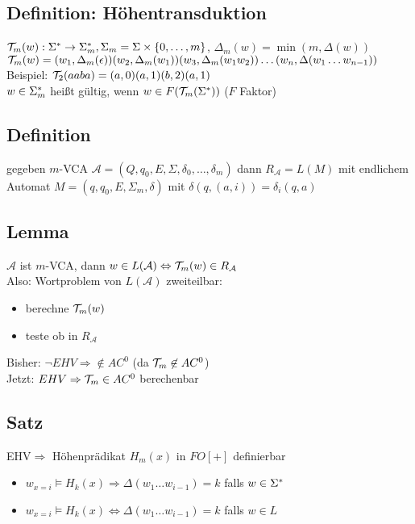    \subsection{Definition: Höhentransduktion}
        $\mathcal{T}_m(w):\Sigma^*\rightarrow\Sigma^*_m, \Sigma_m=\Sigma\times\{0,\dots,m\}$, $\Delta_m(w)=\min(m,\Delta(w))$\\
        $\mathcal{T}_m(w)=(w_1,\Delta_m(\epsilon))(w_2,\Delta_m(w_1))(w_3,\Delta_m(w_1w_2))\dots(w_n,\Delta(w_1\dots w_{n-1}))$\\[1mm]
        Beispiel: $\mathcal{T}_2(aaba)=(a,0)(a,1)(b,2)(a,1)$\\[1mm]
        $w\in\Sigma^*_m$ heißt gültig, wenn $w\in F(\mathcal{T}_m(\Sigma^*))$ ($F$ Faktor)
    \subsection{Definition}
        gegeben $m$-VCA $\mathcal{A}=(Q,q_0,E,\Sigma,\delta_0,\dots,\delta_m)$ dann $R_\mathcal{A}=L(M)$ mit endlichem Automat $M=(q,q_0,E,\Sigma_m,\delta)$ mit $\delta(q,(a,i))=\delta_i(q,a)$
    \subsection{Lemma}
        $\mathcal{A}$ ist $m$-VCA, dann $w\in L(\mathcal{A})\Leftrightarrow\mathcal{T}_m(w)\in R_\mathcal{A}$\\
        Also: Wortproblem von $L(\mathcal{A})$ zweiteilbar:
        \begin{itemize}
            \item berechne $\mathcal{T}_m(w)$
            \item teste ob in $R_\mathcal{A}$
        \end{itemize}
        Bisher: $\neg EHV\Rightarrow\not\in AC^0$ (da $\mathcal{T}_m\not\in AC^0$)\\
        Jetzt: $EHV\Rightarrow \mathcal{T}_m\in AC^0$ berechenbar
    \subsection{Satz}
        EHV$\Rightarrow$ Höhenprädikat $H_m(x)$ in $FO[+]$ definierbar
        \begin{itemize}
            \item $w_{x=i}\models H_k(x)\Rightarrow\Delta(w_1\dots w_{i-1})=k$ falls $w\in\Sigma^*$
            \item $w_{x=i}\models H_k(x)\Leftrightarrow\Delta(w_1\dots w_{i-1})=k$ falls $w\in L$
        \end{itemize}
